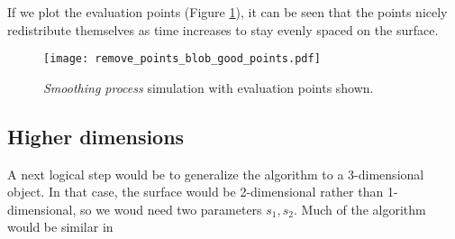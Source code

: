 If we plot the evaluation points (Figure \ref{fig:remove-points-blob-good-points}), it can be seen that the points nicely redistribute themselves as time increases to stay evenly spaced on the surface.

\begin{figure}[H]
    \begin{center}
      \texttt{[image: remove\_points\_blob\_good\_points.pdf]}
    \end{center}
  \vspace{-.2in} %
  \caption{\label{fig:remove-points-blob-good-points}\textit{Smoothing process} simulation with evaluation points shown.}
\end{figure}

\subsection*{Higher dimensions}

A next logical step would be to generalize the algorithm to a 3-dimensional object. In that case, the surface would be 2-dimensional rather than 1-dimensional, so we woud need two parameters $s_1, s_2$. Much of the algorithm would be similar in 